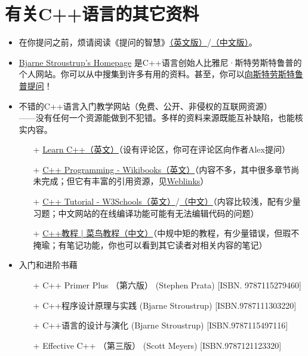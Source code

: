 \chapter{有关C++语言的其它资料}
\begin{itemize}
    \item 在你提问之前，烦请阅读《提问的智慧》\href{http://www.catb.org/~esr/faqs/smart-questions.html}{（英文版）}/\href{https://github.com/ryanhanwu/How-To-Ask-Questions-The-Smart-Way/blob/main/README-zh_CN.md}{（中文版）}。
    \item \href{https://www.stroustrup.com/}{Bjarne Stroustrup's Homepage} 是C++语言创始人比雅尼·斯特劳斯特鲁普的个人网站。你可以从中搜集到许多有用的资料。甚至，你可以\href{https://www.stroustrup.com/bs_faq.html#ask}{向斯特劳斯特鲁普提问}！
    \item 不错的C++语言入门教学网站（免费、公开、非侵权的互联网资源）\\——没有任何一个资源能做到不犯错。多样的资料来源既能互补缺陷，也能核实内容。
    \begin{itemize}
        \item[+] \href{https://www.learncpp.com/}{Learn C++（英文）}（设有评论区，你可在评论区向作者Alex提问）
        \item[+] \href{https://en.wikibooks.org/wiki/C++_Programming}{C++ Programming - Wikibooks（英文）}（内容不多，其中很多章节尚未完成；但它有丰富的引用资源，见\href{https://en.wikibooks.org/wiki/C++_Programming/Weblinks}{Weblinks}）
        \item[+] \href{https://www.w3schools.com/cpp}{C++ Tutorial - W3Schools（英文）}/\href{https://www.w3schools.cn/cpp}{（中文）}（内容比较浅，配有少量习题；中文网站的在线编译功能可能有无法编辑代码的问题）
        \item[+] \href{https://www.runoob.com/cplusplus/cpp-tutorial.html}{C++教程 | 菜鸟教程（中文）}（中规中矩的教程，有少量错误，但瑕不掩瑜；有笔记功能，你也可以看到其它读者对相关内容的笔记）
    \end{itemize}
    \item 入门和进阶书藉
    \begin{itemize}
        \item[+] C++ Primer Plus （第六版） (Stephen Prata) [ISBN. 9787115279460]
        \item[+] C++程序设计原理与实践 (Bjarne Stroustrup) [ISBN.9787111303220]
        \item[+] C++语言的设计与演化 (Bjarne Stroustrup) [ISBN.9787115497116]
        \item[+] Effective C++ （第三版） (Scott Meyers) [ISBN.9787121123320]

\end{itemize}
\end{itemize}
